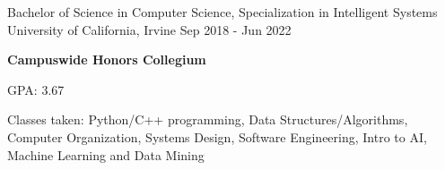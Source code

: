 
\begin{cventries}
  \cventry
    {Bachelor of Science in Computer Science, Specialization in Intelligent Systems} %
    {University of California, Irvine} %
    {} %
    {Sep 2018 - Jun 2022} %
    {
      \begin {cvitems}
        \item{\textbf{Campuswide Honors Collegium}}
        \item {GPA: 3.67}
        \item{Classes taken: Python/C++ programming, Data Structures/Algorithms,
        Computer Organization, Systems Design, Software Engineering, \linebreak Intro to AI, Machine Learning and Data Mining}
      \end{cvitems}
    }
\end{cventries}

